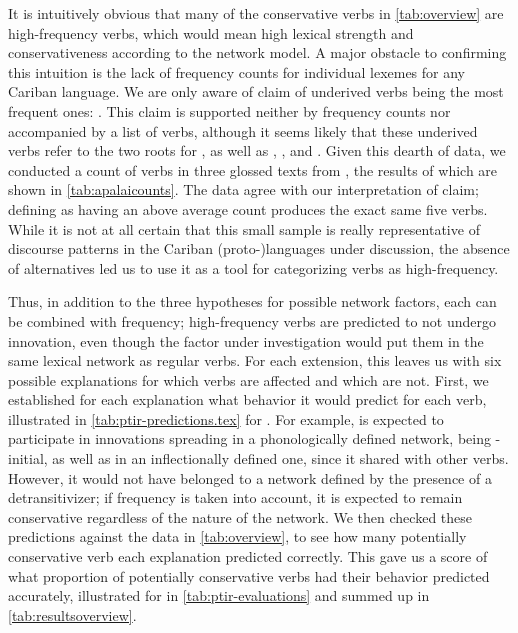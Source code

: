 It is intuitively obvious that many of the conservative verbs in \cref{tab:overview} are high-frequency verbs, which would mean high lexical strength and conservativeness according to the network model.
A major obstacle to confirming this intuition is the lack of frequency counts for individual lexemes for any Cariban language.
We are only aware of  claim of \kalina underived  verbs being the most frequent ones: .
This claim is supported neither by frequency counts nor accompanied by a list of verbs, although it seems likely that these underived  verbs refer to the two roots for , as well as , , and .
Given this dearth of data, we conducted a count of  verbs in three glossed texts from \textcite{koehns1994textos}, the results of which are shown in \cref{tab:apalaicounts}.
The \apalai data agree with our interpretation of  claim; defining  as having an above average count produces the exact same five verbs.
While it is not at all certain that this small \apalai sample is really representative of discourse patterns in the Cariban (proto-)languages under discussion, the absence of alternatives led us to use it as a tool for categorizing verbs as high-frequency.




Thus, in addition to the three hypotheses for possible network factors, each can be combined with frequency; high-frequency verbs are predicted to not undergo innovation, even though the factor under investigation would put them in the same lexical network as regular  verbs.
For each extension, this leaves us with six possible explanations for which verbs are affected and which are not.
First, we established for each explanation what behavior it would predict for each verb, illustrated in \cref{tab:ptir-predictions.tex} for \PTir.
For example,   is expected to participate in innovations spreading in a phonologically defined network, being -initial, as well as in an inflectionally defined one, since it shared  with other  verbs.
However, it would not have belonged to a network defined by the presence of a detransitivizer; if frequency is taken into account, it is expected to remain conservative regardless of the nature of the network.
We then checked these predictions against the data in \cref{tab:overview}, to see how many potentially conservative verb each explanation predicted correctly.
This gave us a score of what proportion of potentially conservative verbs had their behavior predicted accurately, illustrated for \PTir in \cref{tab:ptir-evaluations} and summed up in \cref{tab:resultsoverview}.

